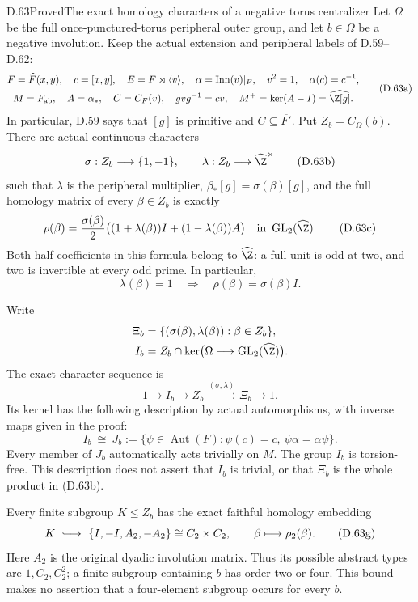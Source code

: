 \begin{claim}{D.63}{Proved}{The exact homology characters of a negative torus centralizer}
Let $\Omega$ be the full once-punctured-torus peripheral
outer group, and let $b\in\Omega$ be a negative involution.
Keep the actual extension and peripheral labels of D.59--D.62:
\[
 \begin{gathered}
 F=\widehat F(x,y),\quad c=[x,y],\quad
 E=F\rtimes\langle v\rangle,\quad
 \alpha=\operatorname{Inn}(v)|_F,\quad
 v^2=1,\quad \alpha(c)=c^{-1},\\
 M=F_{\rm ab},\quad A=\alpha_*,\quad
 C=C_F(v),\quad gvg^{-1}=cv,\quad
 M^+=\ker(A-I)=\widehat\Z[g].
 \end{gathered}                                               \tag{D.63a}
\]
In particular, D.59 says that $[g]$ is primitive and
$C\subseteq\overline{F'}$.
Put $Z_b=C_\Omega(b)$.
There are actual continuous characters
\[
 \sigma:Z_b\longrightarrow\{1,-1\},\qquad
 \lambda:Z_b\longrightarrow\widehat\Z^\times
                                                               \tag{D.63b}
\]
such that $\lambda$ is the peripheral multiplier,
$\beta_*[g]=\sigma(\beta)[g]$, and the full homology
matrix of every $\beta\in Z_b$ is exactly
\[
 \rho(\beta)=
 \frac{\sigma(\beta)}2
 \bigl((1+\lambda(\beta))I+(1-\lambda(\beta))A\bigr)
       \quad\text{in }\operatorname{GL}_2(\widehat\Z).
                                                               \tag{D.63c}
\]
Both half-coefficients in this formula belong to
$\widehat\Z$: a full unit is odd at two, and two
is invertible at every odd prime.
In particular,
\[
          \lambda(\beta)=1
       \quad\Longrightarrow\quad
          \rho(\beta)=\sigma(\beta)I.                          \tag{D.63d}
\]

Write
\[
 \begin{split}
 \Xi_b&=\{(\sigma(\beta),\lambda(\beta)):\beta\in Z_b\},\\
 I_b&=Z_b\cap\ker\bigl(\Omega\longrightarrow
                          \operatorname{GL}_2(\widehat\Z)\bigr).
 \end{split}
\]
The exact character sequence is
\[
 1\longrightarrow I_b\longrightarrow Z_b
       \xrightarrow{\,(\sigma,\lambda)\,}\Xi_b
       \longrightarrow1.                                    \tag{D.63e}
\]
Its kernel has the following description by actual
automorphisms, with inverse maps given in the proof:
\[
 I_b\ \cong\
 J_b:=
 \{\psi\in\operatorname{Aut}(F):
          \psi(c)=c,\ \psi\alpha=\alpha\psi\}.                 \tag{D.63f}
\]
Every member of $J_b$ automatically acts trivially on $M$.
The group $I_b$ is torsion-free.
This description does not assert that $I_b$ is trivial,
or that $\Xi_b$ is the whole product in (D.63b).

Every finite subgroup $K\leq Z_b$ has the exact
faithful homology embedding
\[
 K\ \lhook\joinrel\longrightarrow\
       \{I,-I,A_2,-A_2\}\cong C_2\times C_2,
       \qquad \beta\longmapsto \rho_2(\beta).                 \tag{D.63g}
\]
Here $A_2$ is the original dyadic involution matrix.
Thus its possible abstract types are $1,C_2,C_2^2$;
a finite subgroup containing $b$ has order two or four.
This bound makes no assertion that a four-element
subgroup occurs for every $b$.
\end{claim}

